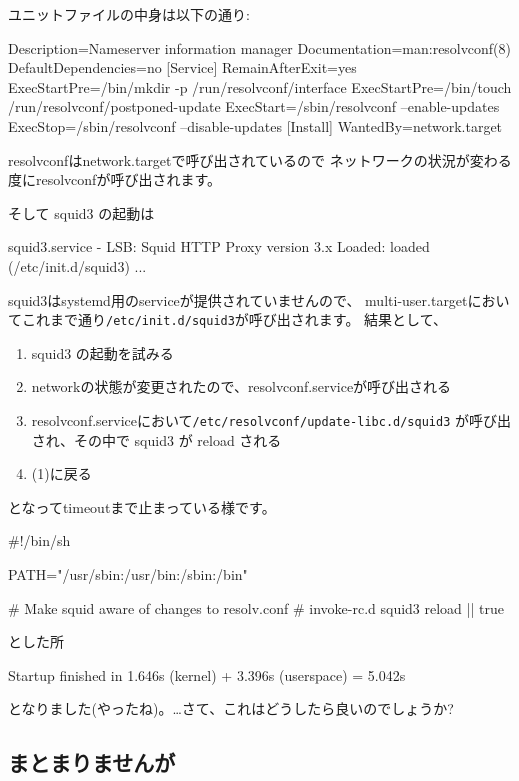 \documentclass[mingoth,a4paper]{jsarticle}
\begin{document}
ユニットファイルの中身は以下の通り:
\begin{commandline}
[Unit]
Description=Nameserver information manager
Documentation=man:resolvconf(8)
DefaultDependencies=no
[Service]
RemainAfterExit=yes
ExecStartPre=/bin/mkdir -p /run/resolvconf/interface
ExecStartPre=/bin/touch /run/resolvconf/postponed-update
ExecStart=/sbin/resolvconf --enable-updates
ExecStop=/sbin/resolvconf --disable-updates
[Install]
WantedBy=network.target
\end{commandline}
\noindent
resolvconfはnetwork.targetで呼び出されているので
ネットワークの状況が変わる度にresolvconfが呼び出されます。

そして squid3 の起動は
\begin{commandline}
squid3.service - LSB: Squid HTTP Proxy version 3.x
   Loaded: loaded (/etc/init.d/squid3)
   ...
\end{commandline}
squid3はsystemd用のserviceが提供されていませんので、
multi-user.targetにおいてこれまで通り\texttt{/etc/init.d/squid3}が呼び出されます。
結果として、
\begin{enumerate}
\item squid3 の起動を試みる
\item networkの状態が変更されたので、resolvconf.serviceが呼び出される
\item resolvconf.serviceにおいて\texttt{/etc/resolvconf/update-libc.d/squid3} が呼び出され、その中で squid3 が reload される
\item (1)に戻る
\end{enumerate}
となってtimeoutまで止まっている様です。
\begin{commandline}
#!/bin/sh

PATH="/usr/sbin:/usr/bin:/sbin:/bin"

# Make squid aware of changes to resolv.conf
# invoke-rc.d squid3 reload || true
\end{commandline}
とした所
\begin{commandline}
Startup finished in 1.646s (kernel) + 3.396s (userspace) = 5.042s
\end{commandline}
となりました(やったね)。…さて、これはどうしたら良いのでしょうか?

\subsection{まとまりませんが}
\end{document}
